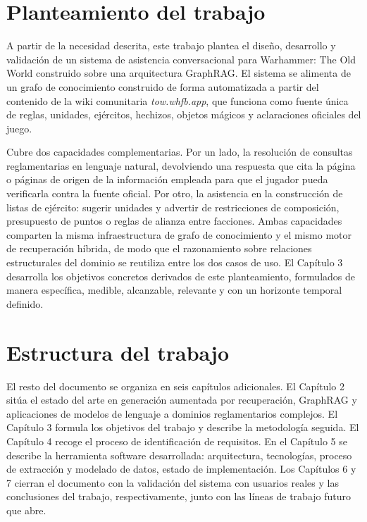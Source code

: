\documentclass[11pt,a4paper,spanish]{book}
\numberwithin{equation}{chapter}
\numberwithin{figure}{chapter}
\numberwithin{table}{chapter}
\begin{document}
\section{Planteamiento del trabajo}

A partir de la necesidad descrita, este trabajo plantea el diseño, desarrollo y validación de un sistema de asistencia conversacional para Warhammer: The Old World construido sobre una arquitectura GraphRAG. El sistema se alimenta de un grafo de conocimiento construido de forma automatizada a partir del contenido de la wiki comunitaria \emph{tow.whfb.app}, que funciona como fuente única de reglas, unidades, ejércitos, hechizos, objetos mágicos y aclaraciones oficiales del juego.

Cubre dos capacidades complementarias. Por un lado, la resolución de consultas reglamentarias en lenguaje natural, devolviendo una respuesta que cita la página o páginas de origen de la información empleada para que el jugador pueda verificarla contra la fuente oficial. Por otro, la asistencia en la construcción de listas de ejército: sugerir unidades y advertir de restricciones de composición, presupuesto de puntos o reglas de alianza entre facciones. Ambas capacidades comparten la misma infraestructura de grafo de conocimiento y el mismo motor de recuperación híbrida, de modo que el razonamiento sobre relaciones estructurales del dominio se reutiliza entre los dos casos de uso. El Capítulo 3 desarrolla los objetivos concretos derivados de este planteamiento, formulados de manera específica, medible, alcanzable, relevante y con un horizonte temporal definido.

\section{Estructura del trabajo}

El resto del documento se organiza en seis capítulos adicionales. El Capítulo 2 sitúa el estado del arte en generación aumentada por recuperación, GraphRAG y aplicaciones de modelos de lenguaje a dominios reglamentarios complejos. El Capítulo 3 formula los objetivos del trabajo y describe la metodología seguida. El Capítulo 4 recoge el proceso de identificación de requisitos. En el Capítulo 5 se describe la herramienta software desarrollada: arquitectura, tecnologías, proceso de extracción y modelado de datos, estado de implementación. Los Capítulos 6 y 7 cierran el documento con la validación del sistema con usuarios reales y las conclusiones del trabajo, respectivamente, junto con las líneas de trabajo futuro que abre.
\end{document}
